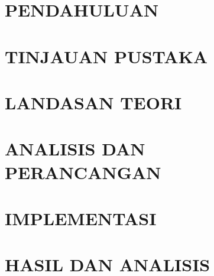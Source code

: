 \documentclass[proposal]{ugmskripsi}
\begin{document}
\cleardoublepage{}


\cleardoublepage{}


\cleardoublepage{}
\pagestyle{myheadings}
\setcounter{page}{1}

\chapter{PENDAHULUAN}
    

\chapter{TINJAUAN PUSTAKA}
    

\chapter{LANDASAN TEORI}
    

\chapter{ANALISIS DAN PERANCANGAN}
    

\chapter{IMPLEMENTASI}
    

\chapter{HASIL DAN ANALISIS}
    
\end{document}
